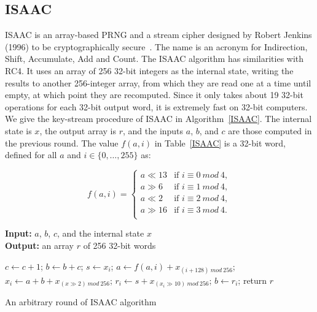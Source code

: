 \subsection{ISAAC}
ISAAC is an array-based PRNG and a stream cipher designed by Robert Jenkins (1996) to be cryptographically secure~\cite{Jenkins1996}. The name is an acronym for Indirection, Shift, Accumulate, Add and Count. The ISAAC algorithm has similarities with RC4. It uses an array of 256 32-bit integers as the internal state, writing the results to another 256-integer array, from which they are read one at a time until empty, at which point they are recomputed. Since it only takes about 19 32-bit operations for each 32-bit output word, it is extremely fast on 32-bit computers.\newline
We give the key-stream procedure of ISAAC in Algorithm~\ref{ISAAC}. The internal state is $x$, the output array is $r$, and the inputs $a$, $b$, and $c$ are those computed in the previous round. %
The value $f(a,i)$ in Table~\ref{ISAAC} is a 32-bit word, defined for all $a$ and $i\in\{0,\dots,255\}$ as:

\begin{equation}
f(a,i) = \left\{\begin{array}{ll}
a\ll13 & \text{if } i\equiv0~mod~4 , \\
a\gg6 & \text{if } i\equiv1~mod~4 , \\
a\ll2 & \text{if } i\equiv2~mod~4 , \\
a\gg16 & \text{if } i\equiv3~mod~4 . \\
\end{array}
\right.
\end{equation}

\begin{algorithm}
\textbf{Input:} $a$, $b$, $c$, and the internal state $x$\\
\textbf{Output:} an array $r$ of 256 32-bit words
\begin{algorithmic}[1]
\STATE$c\leftarrow{c+1}$;
\STATE$b\leftarrow{b+c}$;
\STATE$s\leftarrow{x_i}$;
\STATE$a\leftarrow{f(a,i)+x_{(i+128)~mod~256}}$;
\STATE$x_i\leftarrow{a+b+x_{(x\gg2)~mod~256}}$;
\STATE$r_i\leftarrow{s+x_{(x_i\gg10)~mod~256}}$;
\STATE$b\leftarrow{r_i}$;
\ENDWHILE
\STATE return $r$\;
\medskip
\caption{An arbitrary round of ISAAC algorithm}
\label{ISAAC}
\end{algorithmic}
\end{algorithm}

